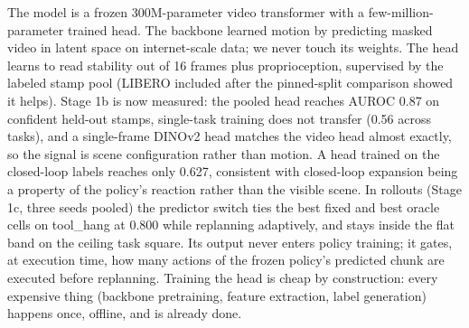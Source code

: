 \documentclass[11pt]{article}
\begin{document}
The model is a frozen 300M-parameter video transformer with a few-million-parameter
trained head. The backbone learned motion by predicting masked video in latent space
on internet-scale data; we never touch its weights. The head learns to read
stability out of 16 frames plus proprioception, supervised by the labeled stamp
pool (LIBERO included after the pinned-split comparison showed it helps). Stage
1b is now measured: the pooled head reaches AUROC 0.87 on confident held-out
stamps, single-task training does not transfer (0.56 across tasks), and a
single-frame DINOv2 head matches the video head almost exactly, so the signal is
scene configuration rather than motion. A head trained on the closed-loop labels
reaches only 0.627, consistent with closed-loop expansion being a property of
the policy's reaction rather than the visible scene. In rollouts (Stage 1c, three seeds
pooled) the predictor switch ties the best fixed and best oracle cells on
tool\_hang at 0.800 while replanning adaptively, and stays inside the flat band
on the ceiling task square.
Its output never enters policy training; it gates, at execution time, how many
actions of the frozen policy's predicted chunk are executed before replanning.
Training the head is cheap by construction: every expensive thing (backbone
pretraining, feature extraction, label generation) happens once, offline, and is
already done.
\end{document}
